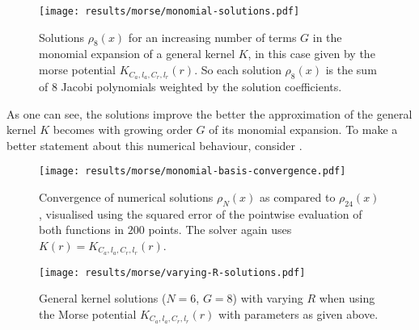 \begin{figure}[H]
  \centering
  \texttt{[image: results/morse/monomial-solutions.pdf]}
  \caption[]{Solutions $\rho_8(x)$ for an increasing number of terms $G$ in the monomial expansion of a general kernel $K$, in this case given by the morse potential $K_{C_a, l_a, C_r, l_r}(r)$. So each solution $\rho_8(x)$ is the sum of $8$ Jacobi polynomials weighted by the solution coefficients.}
  \label{fig:monomial-solutions}
\end{figure}

As one can see, the solutions improve the better the approximation of the general kernel $K$ becomes with growing order $G$ of its monomial expansion.
To make a better statement about this numerical behaviour, consider .

\begin{figure}[H]
  \centering
  \texttt{[image: results/morse/monomial-basis-convergence.pdf]}
  \caption[Step-by-step convergence of solutions when increasing the degree of the monomial]{
    Convergence of numerical solutions $\rho_N(x)$ as compared to $\rho_{24}(x)$, visualised using the squared error of the pointwise evaluation of both functions in $200$ points.
    The solver again uses $K(r) = K_{C_a, l_a, C_r, l_r}(r)$.
  }
  \label{fig:monomial-basis-convergence}
\end{figure}

\begin{figure}[H]
  \centering
  \texttt{[image: results/morse/varying-R-solutions.pdf]}
  \caption[Solutions with varying $R$]{General kernel solutions ($N = 6$, $G = 8$) with varying $R$ when using the Morse potential $K_{C_a, l_a, C_r, l_r}(r)$ with parameters as given above.}
  \label{fig:varying-R-solutions}
\end{figure}

